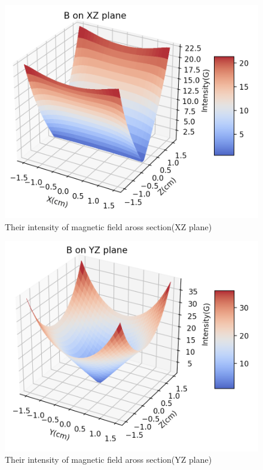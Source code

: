 \documentclass{article}
\begin{document}
\begin{figure}[h]
	\centering
	\includegraphics[scale=0.5]{MOTXZ}
	\caption{Their intensity of magnetic field aross section(XZ plane)}
\end{figure}
\begin{figure}[h]
	\centering
	\includegraphics[scale=0.5]{MOTYZ}
	\caption{Their intensity of magnetic field aross section(YZ plane)}
\end{figure}
\end{document}

